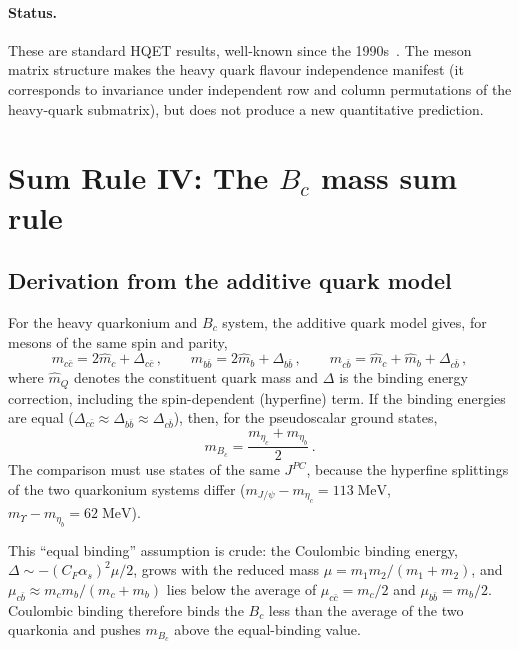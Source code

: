 \documentclass[11pt,a4paper]{article}
\theoremstyle{plain}
\begin{document}
\paragraph{Status.} These are standard HQET results, well-known since
the 1990s~\cite{ManoharWise2000,Neubert1994}.  The meson matrix
structure makes the heavy quark flavour independence manifest (it
corresponds to invariance under independent row and column
permutations of the heavy-quark submatrix), but does not produce a
new quantitative prediction.


\section{Sum Rule IV: The $B_c$ mass sum rule}
\label{sec:bc}

\subsection{Derivation from the additive quark model}

For the heavy quarkonium and $B_c$ system, the additive quark model
gives, for mesons of the same spin and parity,
\begin{equation}\label{eq:aqm}
  m_{c\bar{c}} = 2\hat{m}_c + \Delta_{c\bar{c}}\,,\qquad
  m_{b\bar{b}} = 2\hat{m}_b + \Delta_{b\bar{b}}\,,\qquad
  m_{c\bar{b}} = \hat{m}_c + \hat{m}_b + \Delta_{c\bar{b}}\,,
\end{equation}
where $\hat{m}_Q$ denotes the constituent quark mass and $\Delta$ is
the binding energy correction, including the spin-dependent (hyperfine)
term.  If the binding energies are equal
($\Delta_{c\bar{c}} \approx \Delta_{b\bar{b}} \approx
\Delta_{c\bar{b}}$), then, for the pseudoscalar ground states,
\begin{equation}\label{eq:bc-sum-rule}
  \boxed{m_{B_c} = \frac{m_{\eta_c} + m_{\eta_b}}{2}\,.}
\end{equation}
The comparison must use states of the same $J^{PC}$, because the
hyperfine splittings of the two quarkonium systems differ
($m_{J/\psi} - m_{\eta_c} = 113\;\text{MeV}$,
$m_\Upsilon - m_{\eta_b} = 62\;\text{MeV}$).

This ``equal binding'' assumption is crude: the Coulombic binding
energy, $\Delta \sim -(C_F\alpha_s)^2 \mu / 2$, grows with the reduced
mass $\mu = m_1 m_2/(m_1 + m_2)$, and $\mu_{c\bar{b}} \approx
m_c m_b/(m_c + m_b)$ lies below the average of
$\mu_{c\bar{c}} = m_c/2$ and $\mu_{b\bar{b}} = m_b/2$.  Coulombic
binding therefore binds the $B_c$ less than the average of the two
quarkonia and pushes $m_{B_c}$ above the equal-binding value.
\end{document}
